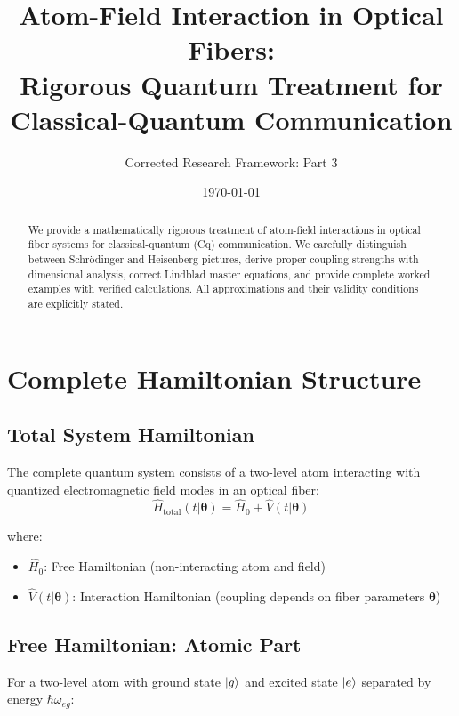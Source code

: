 \documentclass[12pt,a4paper]{article}
\title{\textbf{Atom-Field Interaction in Optical Fibers:} \\ \textbf{Rigorous Quantum Treatment for Classical-Quantum Communication}}
\author{Corrected Research Framework: Part 3}
\date{\today}
\begin{document}
\maketitle

\begin{abstract}
We provide a mathematically rigorous treatment of atom-field interactions in optical fiber systems for classical-quantum (Cq) communication. We carefully distinguish between Schrödinger and Heisenberg pictures, derive proper coupling strengths with dimensional analysis, correct Lindblad master equations, and provide complete worked examples with verified calculations. All approximations and their validity conditions are explicitly stated.
\end{abstract}

\tableofcontents
\newpage

\section{Complete Hamiltonian Structure}

\subsection{Total System Hamiltonian}

The complete quantum system consists of a two-level atom interacting with quantized electromagnetic field modes in an optical fiber:
\begin{equation}
\hat{H}_{\text{total}}(t|\boldsymbol{\theta}) = \hat{H}_0 + \hat{V}(t|\boldsymbol{\theta}) \label{eq:total_ham}
\end{equation}

where:
\begin{itemize}[leftmargin=*]
\item $\hat{H}_0$: Free Hamiltonian (non-interacting atom and field)
\item $\hat{V}(t|\boldsymbol{\theta})$: Interaction Hamiltonian (coupling depends on fiber parameters $\boldsymbol{\theta}$)
\end{itemize}

\subsection{Free Hamiltonian: Atomic Part}

For a two-level atom with ground state $\ket{g}$ and excited state $\ket{e}$ separated by energy $\hbar\omega_{eg}$:
\end{document}
